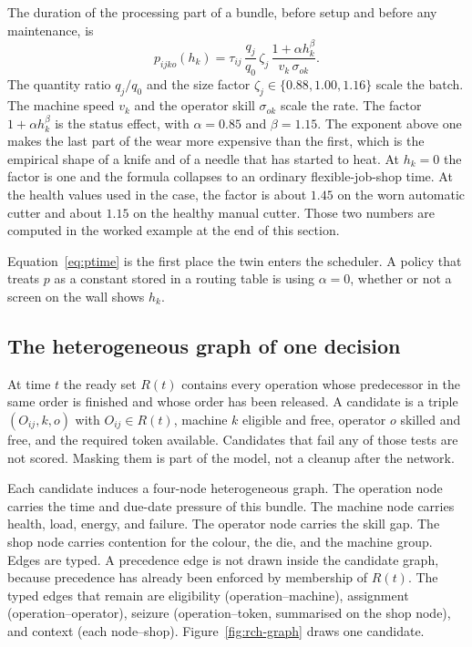 The duration of the processing part of a bundle, before setup and before any maintenance, is
\begin{equation}
p_{ijko}(h_k) = \tau_{ij}\,\frac{q_j}{q_0}\,\zeta_j\,\frac{1 + \alpha h_k^{\beta}}{v_k \, \sigma_{ok}} .
\label{eq:ptime}
\end{equation}
The quantity ratio \(q_j/q_0\) and the size factor \(\zeta_j \in \{0.88, 1.00, 1.16\}\) scale the batch. The machine speed \(v_k\) and the operator skill \(\sigma_{ok}\) scale the rate. The factor \(1 + \alpha h_k^{\beta}\) is the status effect, with \(\alpha = 0.85\) and \(\beta = 1.15\). The exponent above one makes the last part of the wear more expensive than the first, which is the empirical shape of a knife and of a needle that has started to heat. At \(h_k = 0\) the factor is one and the formula collapses to an ordinary flexible-job-shop time. At the health values used in the case, the factor is about \(1.45\) on the worn automatic cutter and about \(1.15\) on the healthy manual cutter. Those two numbers are computed in the worked example at the end of this section.

Equation~\eqref{eq:ptime} is the first place the twin enters the scheduler. A policy that treats \(p\) as a constant stored in a routing table is using \(\alpha = 0\), whether or not a screen on the wall shows \(h_k\).

\subsection{The heterogeneous graph of one decision}

At time \(t\) the ready set \(R(t)\) contains every operation whose predecessor in the same order is finished and whose order has been released. A candidate is a triple \((O_{ij}, k, o)\) with \(O_{ij} \in R(t)\), machine \(k\) eligible and free, operator \(o\) skilled and free, and the required token available. Candidates that fail any of those tests are not scored. Masking them is part of the model, not a cleanup after the network.

Each candidate induces a four-node heterogeneous graph. The operation node carries the time and due-date pressure of this bundle. The machine node carries health, load, energy, and failure. The operator node carries the skill gap. The shop node carries contention for the colour, the die, and the machine group. Edges are typed. A precedence edge is not drawn inside the candidate graph, because precedence has already been enforced by membership of \(R(t)\). The typed edges that remain are eligibility (operation--machine), assignment (operation--operator), seizure (operation--token, summarised on the shop node), and context (each node--shop). Figure~\ref{fig:rch-graph} draws one candidate.

